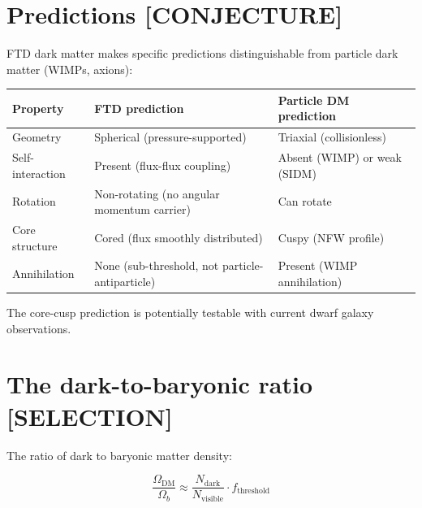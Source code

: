 \documentclass[
  11pt,
  letterpaper,
  twoside,
  openany]{book}
\makeatletter
\let\orig@section\section
\renewcommand{\section}{\needspace{8\baselineskip}\orig@section}
\makeatother
\begin{document}
\section{Predictions {[}CONJECTURE{]}}\label{predictions-conjecture}

FTD dark matter makes specific predictions distinguishable from particle
dark matter (WIMPs, axions):

\begin{longtable}[]{@{}
  >{\raggedright\arraybackslash}p{}
  >{\raggedright\arraybackslash}p{}
  >{\raggedright\arraybackslash}p{}@{}}
\toprule\noalign{}
\begin{minipage}[b]{\linewidth}\raggedright
Property
\end{minipage} & \begin{minipage}[b]{\linewidth}\raggedright
FTD prediction
\end{minipage} & \begin{minipage}[b]{\linewidth}\raggedright
Particle DM prediction
\end{minipage} \\
\midrule\noalign{}
\endhead
\bottomrule\noalign{}
\endlastfoot
Geometry & Spherical (pressure-supported) & Triaxial (collisionless) \\
Self-interaction & Present (flux-flux coupling) & Absent (WIMP) or weak
(SIDM) \\
Rotation & Non-rotating (no angular momentum carrier) & Can rotate \\
Core structure & Cored (flux smoothly distributed) & Cuspy (NFW
profile) \\
Annihilation & None (sub-threshold, not particle-antiparticle) & Present
(WIMP annihilation) \\
\end{longtable}

The core-cusp prediction is potentially testable with current dwarf
galaxy observations.

\section{The dark-to-baryonic ratio
{[}SELECTION{]}}\label{the-dark-to-baryonic-ratio-selection}

The ratio of dark to baryonic matter density:

\[
\frac{\Omega_{\text{DM}}}{\Omega_b} \approx \frac{N_{\text{dark}}}{N_{\text{visible}}} \cdot f_{\text{threshold}}
\tag{22.1}
\]
\end{document}
